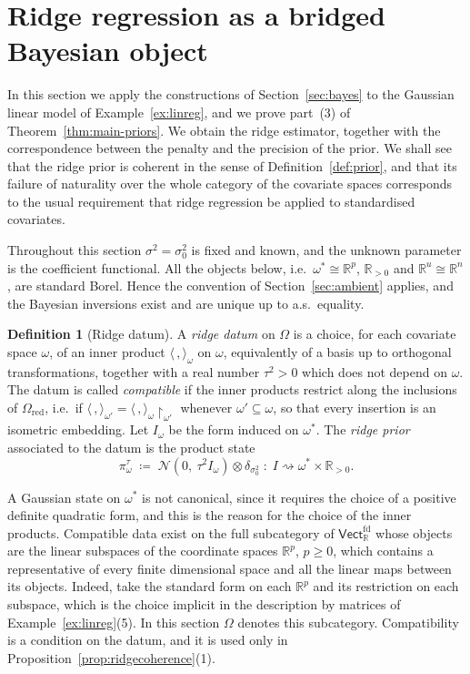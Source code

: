 \documentclass[11pt,a4paper]{article}
\theoremstyle{plain}
\theoremstyle{definition}
\newtheorem{definition}[theorem]{Definition}
\theoremstyle{remark}
\newcommand{\cat}[1]{\mathsf{#1}}
\newcommand{\catO}{\cat{\Omega}}
\newcommand{\R}{\mathbb{R}}
\newcommand{\Vect}{\cat{Vect}}
\newcommand{\Norm}{\mathcal{N}}
\begin{document}
\section{Ridge regression as a bridged Bayesian object}\label{sec:ridge}

In this section we apply the constructions of Section~\ref{sec:bayes} to the
Gaussian linear model of Example~\ref{ex:linreg}, and we prove part~(3) of
Theorem~\ref{thm:main-priors}. We obtain the ridge estimator, together with
the correspondence between the penalty and the precision of the prior. We
shall see that the ridge prior is coherent in the sense of
Definition~\ref{def:prior}, and that its failure of naturality over the whole
category of the covariate spaces corresponds to the usual requirement that
ridge regression be applied to standardised covariates.

Throughout this section $\sigma^{2} = \sigma_{0}^{2}$ is fixed and known, and
the unknown parameter is the coefficient functional. All the objects below,
i.e.\ $\omega^{*} \cong \R^{p}$, $\R_{>0}$ and $\R^{u} \cong \R^{n}$, are
standard Borel. Hence the convention of Section~\ref{sec:ambient} applies, and
the Bayesian inversions exist and are unique up to a.s.\ equality.

\begin{definition}[Ridge datum]\label{def:ridge}
A \emph{ridge datum} on $\catO$ is a choice, for each covariate space
$\omega$, of an inner product $\langle\,,\rangle_{\omega}$ on $\omega$,
equivalently of a basis up to orthogonal transformations, together with a real
number $\tau^{2} > 0$ which does not depend on $\omega$. The datum is called
\emph{compatible} if the inner
products restrict along the inclusions of $\catO_{\mathrm{red}}$, i.e.\ if
$\langle\,,\rangle_{\omega'} =
\langle\,,\rangle_{\omega}\restriction_{\omega'}$ whenever
$\omega' \subseteq \omega$, so that every insertion is an isometric embedding.
Let $I_{\omega}$ be the form induced on $\omega^{*}$. The \emph{ridge prior}
associated to the datum is the product state
\[
\pi^{\tau}_{\omega}
\;\coloneqq\;
\Norm(0,\ \tau^{2} I_{\omega}) \otimes \delta_{\sigma_{0}^{2}}
\;\colon\; I \rightsquigarrow \omega^{*} \times \R_{>0} .
\]
\end{definition}

A Gaussian state on $\omega^{*}$ is not canonical, since it requires the choice
of a positive definite quadratic form, and this is the reason for the choice of
the inner products. Compatible data exist on the full subcategory of
$\Vect^{\mathrm{fd}}_{\R}$ whose objects are the linear subspaces of the
coordinate spaces $\R^{p}$, $p \ge 0$, which contains a representative of
every finite dimensional space and all the linear maps between its objects.
Indeed, take the standard form on each $\R^{p}$ and its restriction on each
subspace, which is the choice implicit in the description by matrices of
Example~\ref{ex:linreg}(5). In this section $\catO$ denotes this
subcategory. Compatibility is a condition on the datum, and it is used only
in Proposition~\ref{prop:ridgecoherence}(1).
\end{document}
